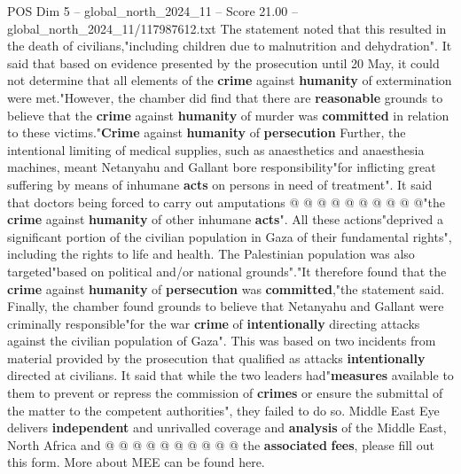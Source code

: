 \begin{textsample}{POS Dim 5 – global\_north\_2024\_11 – Score 21.00 – global\_north\_2024\_11/117987612.txt}
The statement noted that this resulted in the death of civilians,"including children due to malnutrition and dehydration".
It said that based on evidence presented by the prosecution until 20 May, it could not determine that all elements of the \textbf{crime} against \textbf{humanity} of extermination were met."However, the chamber did find that there are \textbf{reasonable} grounds to believe that the \textbf{crime} against \textbf{humanity} of murder was \textbf{committed} in relation to these victims."\textbf{Crime} against \textbf{humanity} of \textbf{persecution} Further, the intentional limiting of medical supplies, such as anaesthetics and anaesthesia machines, meant Netanyahu and Gallant bore responsibility"for inflicting great suffering by means of inhumane \textbf{acts} on persons in need of treatment".
It said that doctors being forced to carry out amputations @ @ @ @ @ @ @ @ @ @"the \textbf{crime} against \textbf{humanity} of other inhumane \textbf{acts}".
All these actions"deprived a significant portion of the civilian population in Gaza of their fundamental rights", including the rights to life and health.
The Palestinian population was also targeted"based on political and/or national grounds"."It therefore found that the \textbf{crime} against \textbf{humanity} of \textbf{persecution} was \textbf{committed},"the statement said.
Finally, the chamber found grounds to believe that Netanyahu and Gallant were criminally responsible"for the war \textbf{crime} of \textbf{intentionally} directing attacks against the civilian population of Gaza".
This was based on two incidents from material provided by the prosecution that qualified as attacks \textbf{intentionally} directed at civilians.
It said that while the two leaders had"\textbf{measures} available to them to prevent or repress the commission of \textbf{crimes} or ensure the submittal of the matter to the competent authorities", they failed to do so.
Middle East Eye delivers \textbf{independent} and unrivalled coverage and \textbf{analysis} of the Middle East, North Africa and @ @ @ @ @ @ @ @ @ @ the \textbf{associated} \textbf{fees}, please fill out this form.
More about MEE can be found here.

\end{textsample}

